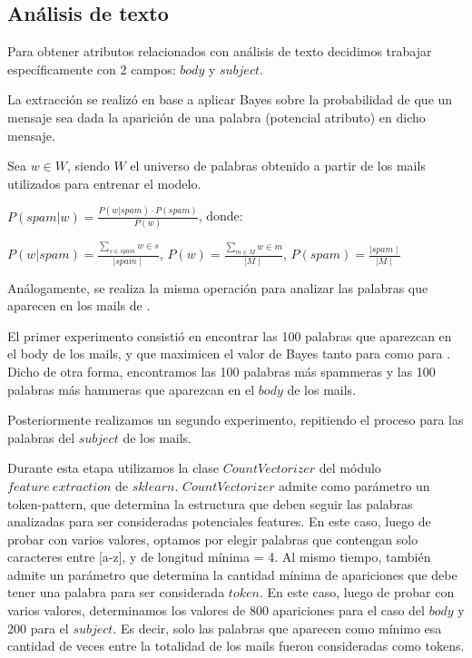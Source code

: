 \subsection{Análisis de texto}

Para obtener atributos relacionados con análisis de texto decidimos trabajar específicamente con 2 campos: \(body\) y \(subject\).

La extracción se realizó en base a aplicar Bayes sobre la probabilidad de que un mensaje sea \spam{} dada la aparición de una palabra (potencial atributo) en dicho mensaje.

Sea $w \in W$, siendo $W$ el universo de palabras obtenido a partir de los mails utilizados para entrenar el modelo.

\vspace{5px}
$P(spam \vert w) = \frac{P(w \vert spam) \cdot P(spam)}{P(w)}$, donde:

\vspace{5px}
$P(w \vert spam) = \frac{\sum_{s \in spam}^{} w \in s}{\mid spam \mid}$, $P(w) = \frac{\sum_{m \in M}^{} w \in m}{\mid M \mid}$, $P(spam) = \frac{\mid spam \mid}{\mid M \mid}$

\vspace{5px}
Análogamente, se realiza la misma operación para analizar las palabras que aparecen en los mails de \ham{}.

El primer experimento consistió en encontrar las 100 palabras que aparezcan en el body de los mails, y que maximicen el valor de Bayes tanto para \spam{} como
para \ham{}. Dicho de otra forma, encontramos las 100 palabras más spammeras y las 100 palabras más hammeras que aparezcan en el \(body\) de los mails.

Posteriormente realizamos un segundo experimento, repitiendo el proceso para las palabras del \(subject\) de los mails.

Durante esta etapa utilizamos la clase \(CountVectorizer\) del módulo \(feature \ extraction\) de \(sklearn\). \(CountVectorizer\) admite como parámetro un token-pattern,
que determina la estructura que deben seguir las palabras analizadas para ser consideradas potenciales features. En este caso, luego de probar con varios valores, optamos
por elegir palabras que contengan solo caracteres entre [a-z], y de longitud mínima = 4. Al mismo tiempo, también admite un parámetro que determina
la cantidad mínima de apariciones que debe tener una palabra para ser considerada \(token\). En este caso, luego de probar con varios valores, determinamos los valores de
800 apariciones para el caso del \(body\) y 200 para el \(subject\). Es decir, solo las palabras que aparecen como mínimo esa cantidad de veces entre la totalidad de
los mails fueron consideradas como tokens.
